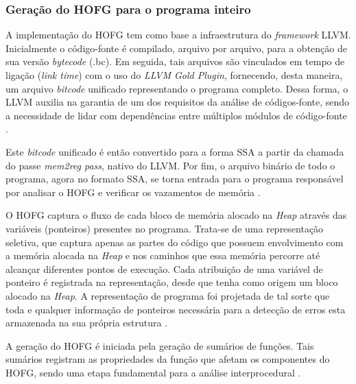 \documentclass[
    12pt,                %
    openright,           %
    oneside,             %
    a4paper,             %
    english,             %
    brazil               %
]{abntex2}
\begin{document}
\subsubsection{Geração do HOFG para o programa inteiro}

A implementação do HOFG tem como base a infraestrutura do \textit{framework} LLVM. Inicialmente o código-fonte é compilado, arquivo por arquivo, para a obtenção de sua versão \textit{bytecode} (.bc). Em seguida, tais arquivos são vinculados em tempo de ligação (\textit{link time}) com o uso do \textit{LLVM Gold Plugin}, fornecendo, 
desta maneira, um arquivo \textit{bitcode} unificado representando o programa completo. Dessa forma, o LLVM auxilia na garantia de um dos requisitos da análise de códigos-fonte, sendo a necessidade de lidar com dependências entre múltiplos módulos de código-fonte \cite{MadhavC2023}.

\par
Este \textit{bitcode} unificado é então convertido para a forma SSA a partir da chamada do passe \textit{mem2reg pass}, nativo do LLVM. Por fim, o arquivo binário de todo o programa, agora no formato SSA, se torna entrada para o programa responsável por analisar o HOFG e verificar os vazamentos de memória \cite{MadhavC2023}.

\par
O HOFG captura o fluxo de cada bloco de memória alocado na \textit{Heap} através das variáveis (ponteiros) presentes no programa. Trata-se de uma representação seletiva, que captura apenas as partes do código que possuem envolvimento com a memória alocada na \textit{Heap} e nos caminhos que essa memória percorre até alcançar diferentes pontos de execução. 
Cada atribuição de uma variável de ponteiro é registrada na representação, desde que tenha como origem um bloco alocado na \textit{Heap}. A representação de programa foi projetada de tal sorte que toda e qualquer informação de ponteiros necessária para a detecção de erros esta armazenada na sua própria estrutura \cite{MadhavC2023}. 

\par
A geração do HOFG é iniciada pela geração de sumários de funções. Tais sumários registram as propriedades da função que afetam os componentes do HOFG, sendo uma etapa fundamental para a análise interprocedural \cite{MadhavC2023}.

\par
\end{document}
